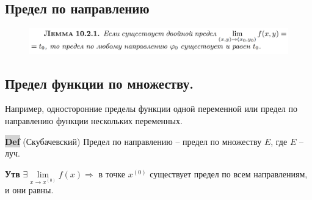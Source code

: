 \documentclass{article}
\newcommand{\bb}{\textbf}
\begin{document}
\subsection{Предел по направлению}
\begin{figure}[h!]
    \centering
    \vspace{-1cm}
\end{figure}
\begin{figure}[h!]
    \centering
    \includegraphics[width=\textwidth]{20.png}
    \vspace{-1cm}
\end{figure}
\newpage
\subsection{Предел функции по множеству.}
\begin{figure}[h!]
    \centering
\end{figure}
Например, односторонние пределы функции одной переменной или предел по направлению функции нескольких переменных.

{\bfseries\colorbox{lightgray}{Def}} (Скубачевский) Предел по направлению -- предел по множеству $E$, где $E$ -- луч.

\bb{Утв} $\exists \lim\limits_{x\to x^{(0)}} f(x) \Rightarrow$ в точке $x^{(0)}$ существует предел по всем направлениям, и они равны.
\end{document}
